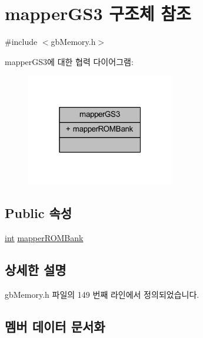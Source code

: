 \hypertarget{structmapper_g_s3}{}\section{mapper\+G\+S3 구조체 참조}
\label{structmapper_g_s3}


{\ttfamily \#include $<$gb\+Memory.\+h$>$}



mapper\+G\+S3에 대한 협력 다이어그램\+:\nopagebreak
\begin{figure}[H]
\begin{center}
\leavevmode
\includegraphics[width=183pt]{structmapper_g_s3__coll__graph}
\end{center}
\end{figure}
\subsection*{Public 속성}
\begin{DoxyCompactItemize}
\item 
\mbox{\hyperlink{_util_8cpp_a0ef32aa8672df19503a49fab2d0c8071}{int}} \mbox{\hyperlink{structmapper_g_s3_a375ce461bdac1b363b026c832000513e}{mapper\+R\+O\+M\+Bank}}
\end{DoxyCompactItemize}


\subsection{상세한 설명}


gb\+Memory.\+h 파일의 149 번째 라인에서 정의되었습니다.



\subsection{멤버 데이터 문서화}
\mbox{\label{structmapper_g_s3_a375ce461bdac1b363b026c832000513e}} 
